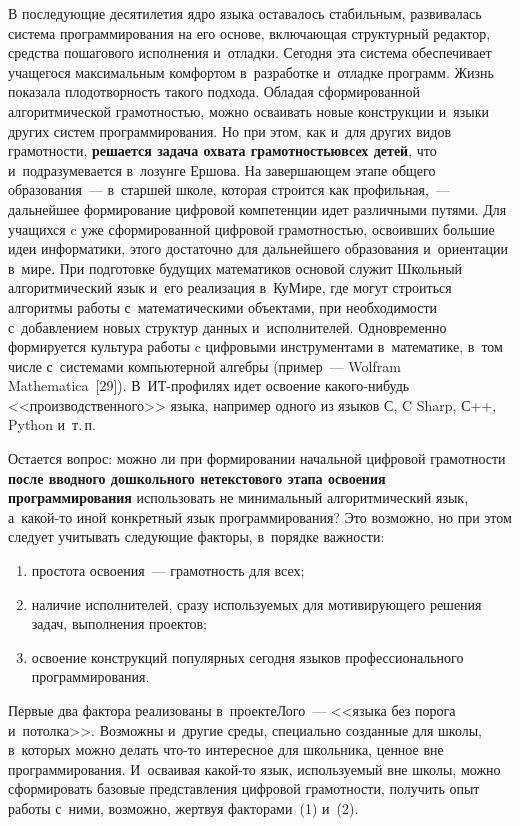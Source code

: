 \begin{multicols}{2}
  В последующие десятилетия ядро языка оставалось стабильным, 
развивалась система программирования на его основе, включающая 
структурный редактор, средства пошагового исполнения и~отладки. Сегодня 
эта система обеспечивает учащегося максимальным комфортом в~разработке и~отладке
 программ. Жизнь показала плодотворность такого подхода. 
Обладая сформированной алгоритмической грамотностью, можно осваивать 
новые конструкции и~языки других систем программирования. Но при этом, 
как и~для других видов грамотности, \textbf{решается задача охвата 
грамотностью\linebreak всех детей}, что и~подразумевается в~лозунге Ер\-шова. На 
завершающем этапе общего образования~--- в~старшей школе, которая 
строится как профильная,~--- дальнейшее формирование цифровой\linebreak 
компетенции идет различными путями. Для учащихся c уже сформированной 
цифровой грамот\-ностью, освоивших большие идеи информатики, этого 
достаточно для дальнейшего образования и~ориентации в~мире. При 
подготовке будущих математиков основой  служит Школьный 
алгоритмический язык и~его реализация в~КуМире, где могут строиться 
алгоритмы работы с~математическими объектами, при необходимости 
с~добавлением новых структур данных и~исполнителей. Одновременно 
формируется культура работы c цифровыми инструментами в~математике, 
в~том числе с~системами компьютерной алгебры (пример~--- Wolfram 
Mathematica~[29]). В~ИТ-про\-фи\-лях идет освоение какого-нибудь 
<<производственного>> языка, например одного из языков С, C Sharp, С++, 
Python и~т.\,п.
  
  Остается вопрос: можно ли при формировании начальной цифровой 
грамотности \textbf{после вводного дошкольного нетекстового этапа освоения 
программирования} использовать не минимальный алгоритмический язык,  
а~ка\-кой-то иной конкретный язык программирования? Это возможно, но 
при этом следует учитывать следующие факторы, в~порядке важности:
  \begin{enumerate}[(1)]
\item простота освоения~--- грамотность для всех;
\item наличие исполнителей, сразу используемых для мотивирующего 
решения задач, выполнения проектов;
\item освоение конструкций популярных сегодня языков 
профессионального программирования.
  \end{enumerate}
  
  Первые два фактора реализованы в~проекте\linebreak Лого~--- <<языка без порога 
  и~потолка>>. Возможны и~другие среды, специально созданные для школы, 
  в~которых можно делать что-то интересное для школьника, ценное вне 
программирования. И~осваивая какой-то язык, используемый вне школы, 
можно сформировать базовые представления цифровой грамотности, 
получить опыт работы с~ними, возможно, жертвуя факторами~(1) и~(2).
  

\end{multicols}
